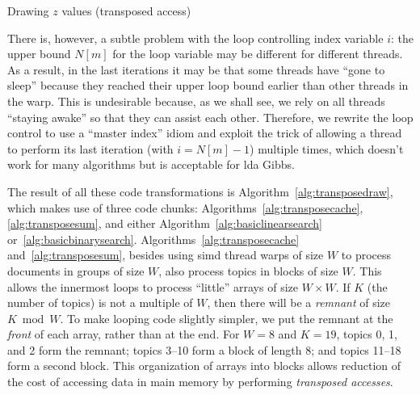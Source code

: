 \documentclass[10pt,nohyperref]{sigplanconf}
\newcommand*\Assign[2]{\State #1 $\gets$ #2}
\newcommand*\LocalArray[1]{\State {\bf local array} #1}
\newcommand*\Bind[2]{\State {\bf let} #1 $\gets$ #2}
\newcommand*\Var[1]{{\mathit{#1}}}
\newcommand*\Output{\;\mathbf{output}\;}
\newcommand*\ProcTwoX[1]{\State\hbox{\hskip-\algorithmicindent\hskip\wd\proctwobox#1$\bigr)$}}
\newcommand*\UseCodeChunk[1]{\State $\langle${#1}$\rangle$}
\begin{document}
\begin{algorithm}[t]
\caption{Drawing $z$ values (transposed access)}\label{alg:transposedraw}
\end{algorithm}


There is, however, a subtle problem with the loop controlling index variable $i$: the upper bound $N[m]$ for the loop
variable may be different for different threads.  As a result, in the last iterations it may be that some threads
have ``gone to sleep'' because they reached their upper loop bound earlier than other threads in the warp.
This is undesirable because, as we shall see, we rely on all threads ``staying awake'' so that they can assist
each other.  Therefore, we rewrite the loop control to use a ``master index'' idiom and exploit the trick of allowing a thread
to perform its last iteration (with $i=N[m]-1$) multiple times, which doesn't work for many algorithms
but is acceptable for {\sc lda} Gibbs.


The result of all these code transformations is Algorithm~\ref{alg:transposedraw},
which makes use of three code chunks: Algorithms~\ref{alg:transposecache}, \ref{alg:transposesum}, and either
Algorithm~\ref{alg:basiclinearsearch} or~\ref{alg:basicbinarysearch}.
Algorithms~\ref{alg:transposecache} and~\ref{alg:transposesum}, besides using {\sc simd} thread warps of size $W$
to process documents in groups of size $W$, also process topics in blocks of size $W$.  This allows the innermost loops to process ``little'' arrays
of size $W \times W$.  If $K$ (the number of topics) is not a multiple of $W$, then there will be a \emph{remnant} of size $K \bmod W$.
To make looping code slightly simpler, we put the remnant at the \emph{front} of each array, rather than at the end.
For $W=8$ and $K=19$, topics 0, 1, and 2 form the remnant; topics 3--10 form a block of length 8;
and topics 11--18 form a second block.  This organization of arrays into blocks
allows reduction of the cost of accessing data in main memory by performing \emph{transposed accesses}.
\end{document}
